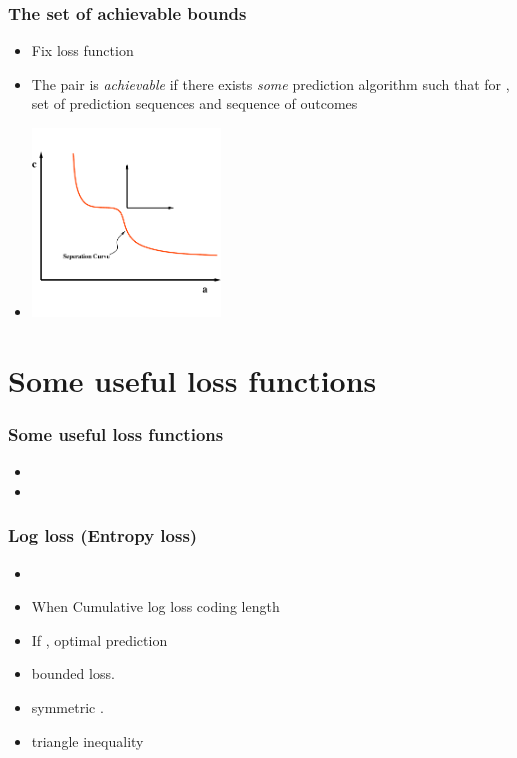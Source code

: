 \documentclass[handout]{beamer}
\begin{document}
\begin{frame}
\frametitle{The set of achievable bounds}
\begin{itemize}
\item 
Fix loss function \R{$\lambda: \Omega \times \Gamma \to [0,\infty)$}
\item
The pair  is {\em achievable} if there exists 
{\em some} prediction algorithm
such that for  ,  set of  prediction
sequences and  sequence of outcomes
\item
\begin{center}
\includegraphics[height=5cm]{figures/achievable1.pdf}
\end{center}
\end{itemize}
\end{frame}

\section{Some useful loss functions}

\begin{frame}
\frametitle{Some useful loss functions}
\begin{itemize}
\item
{}   
\item
{} 
\end{itemize}
\end{frame}

\begin{frame}
\frametitle{Log loss (Entropy loss)} 
\begin{itemize}
\item
\R{\[ \lambda_{\text{ent}}(\omega,\gamma) = \omega \ln \frac{\omega}{\gamma} 
                              +(1-\omega) \ln \frac{1-\omega}{1-\gamma} \]}
\item
When  Cumulative log loss \R{$=$} coding length 
\item
If , optimal prediction 
\item
{}bounded loss.
\item
{} symmetric .
\item
{} triangle inequality
\end{itemize}
\end{frame}
\end{document}
